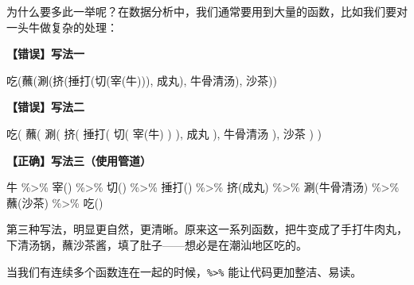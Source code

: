 \documentclass[
  letterpaper,
]{ctexbook}
\newenvironment{Shaded}{\begin{snugshade}}{\end{snugshade}}
\newcommand{\NormalTok}[1]{\textcolor[rgb]{0.00,0.23,0.31}{#1}}
\newcommand{\SpecialCharTok}[1]{\textcolor[rgb]{0.37,0.37,0.37}{#1}}
\begin{document}
为什么要多此一举呢？在数据分析中，我们通常要用到大量的函数，比如我们要对一头牛做复杂的处理：

\textbf{【错误】写法一}

\begin{Shaded}
\begin{Highlighting}[]
\NormalTok{吃(蘸(涮(挤(捶打(切(宰(牛))), 成丸), 牛骨清汤), 沙茶))}
\end{Highlighting}
\end{Shaded}

\textbf{【错误】写法二}

\begin{Shaded}
\begin{Highlighting}[]
\NormalTok{吃(}
\NormalTok{  蘸(}
\NormalTok{    涮(}
\NormalTok{      挤(}
\NormalTok{        捶打(}
\NormalTok{          切(}
\NormalTok{            宰(牛)}
\NormalTok{          )}
\NormalTok{        ), 成丸}
\NormalTok{      ), 牛骨清汤}
\NormalTok{    ), 沙茶}
\NormalTok{  )}
\NormalTok{)}
\end{Highlighting}
\end{Shaded}

\textbf{【正确】写法三（使用管道）}

\begin{Shaded}
\begin{Highlighting}[]
\NormalTok{牛 }\SpecialCharTok{\%\textgreater{}\%}
\NormalTok{  宰() }\SpecialCharTok{\%\textgreater{}\%}
\NormalTok{  切() }\SpecialCharTok{\%\textgreater{}\%}
\NormalTok{  捶打() }\SpecialCharTok{\%\textgreater{}\%}
\NormalTok{  挤(成丸) }\SpecialCharTok{\%\textgreater{}\%}
\NormalTok{  涮(牛骨清汤) }\SpecialCharTok{\%\textgreater{}\%}
\NormalTok{  蘸(沙茶) }\SpecialCharTok{\%\textgreater{}\%}
\NormalTok{  吃()}
\end{Highlighting}
\end{Shaded}

第三种写法，明显更自然，更清晰。原来这一系列函数，把牛变成了手打牛肉丸，下清汤锅，蘸沙茶酱，填了肚子------想必是在潮汕地区吃的。

\begin{tcolorbox}[enhanced jigsaw, bottomtitle=1mm, bottomrule=.15mm, coltitle=black, title=\textcolor{quarto-callout-tip-color}{\faLightbulb}\hspace{0.5em}{提示}, toptitle=1mm, colframe=quarto-callout-tip-color-frame, colbacktitle=quarto-callout-tip-color!10!white, opacitybacktitle=0.6, arc=.35mm, opacityback=0, breakable, toprule=.15mm, left=2mm, titlerule=0mm, rightrule=.15mm, colback=white, leftrule=.75mm]

当我们有连续多个函数连在一起的时候，\texttt{\%\textgreater{}\%}
能让代码更加整洁、易读。

\end{tcolorbox}
\end{document}
